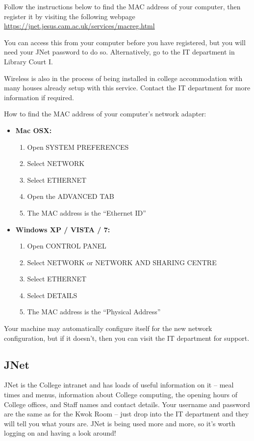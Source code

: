 \documentclass[11pt,fleqn, oneside]{book} %
\begin{document}
Follow the instructions below to find the MAC address of your computer, then register it by visiting the following webpage
\url{https://jnet.jesus.cam.ac.uk/services/macreg.html} 

You can access this from your computer before you have registered, but you will need your JNet password to do so. Alternatively, go to the IT department in Library Court I.

Wireless is also in the process of being installed in college accommodation with many houses already setup with this service. Contact the IT department for more information if required.

How to find the MAC address of your computer’s network adapter:
\begin{itemize}
\item \textbf{Mac OSX:}
\begin{enumerate}
 \item Open SYSTEM PREFERENCES 
\item Select NETWORK
\item Select ETHERNET
\item Open the ADVANCED TAB 
\item The MAC address is the “Ethernet ID”
\end{enumerate}
\item \textbf{Windows XP / VISTA / 7:}
\begin{enumerate}
 \item Open CONTROL PANEL
\item Select NETWORK or NETWORK AND SHARING CENTRE 
\item  Select ETHERNET 
\item Select DETAILS
\item The MAC address is the “Physical Address”
\end{enumerate}
 
\end{itemize}

Your machine may automatically configure itself for the new network configuration, but if it doesn’t, then you can visit the IT department for support.
 
\subsection{JNet}
JNet is the College intranet and has loads of useful information on it – meal times and menus, information about College computing, the opening hours of College offices, and Staff names and contact details.  Your username and password are the same as for the Kwok Room – just drop into the IT department and they will tell you what yours are.  JNet is being used more and more, so it’s worth logging on and having a look around!  
 
\end{document}
